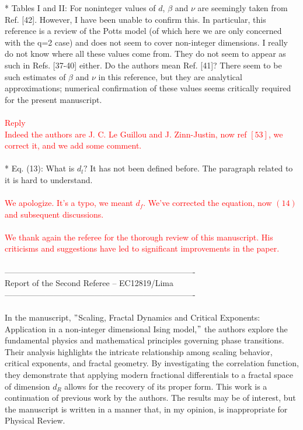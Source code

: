 \documentclass[prd,aps,nofootinbib]{revtex4}
\begin{document}
* Tables I and II: For noninteger values of $d$, $\beta$ and $\nu$ are seemingly taken from Ref. [42]. However, I have been unable to confirm this. In particular, this reference is a review of the Potts model (of which here we are only concerned with the q=2 case) and does not seem to cover non-integer dimensions. I really do not know where all these values come from. They do not seem to appear as such in Refs. [37-40] either. Do the authors mean Ref. [41]? There seem to be such estimates of $\beta$ and $\nu$ in this reference, but they are analytical approximations; numerical confirmation of these values seems critically required for the present manuscript.\\
\\
\textcolor{red}{Reply}\\
\textcolor{red}{ Indeed the authors are J. C. Le Guillou and J. Zinn-Justin, now ref $[53]$, we correct it, and we add some comment.}\\
\\
* Eq. (13): What is $d_l?$ It has not been defined before. The paragraph
related to it is hard to understand.\\
\\
\textcolor{red}{We apologize. It's a typo, we meant $d_f$. We've corrected the equation, now $(14)$ and subsequent discussions. }\\
\\
\textcolor{red}{ We thank again the referee for the thorough review of this manuscript. His criticisms and suggestions have led to significant improvements in the paper.}\\
\\
----------------------------------------------------------------------\\
Report of the Second Referee -- EC12819/Lima\\
----------------------------------------------------------------------\\
\\
In the manuscript, $"$Scaling, Fractal Dynamics and Critical Exponents: Application in a non-integer dimensional Ising model,$"$ the authors explore the fundamental physics and mathematical principles governing phase transitions. Their analysis highlights the intricate relationship among scaling behavior, critical exponents, and fractal geometry. By investigating the correlation function, they demonstrate that applying modern fractional differentials to a fractal space of dimension $d_R$ allows for the recovery of its proper form. This work is a continuation of previous work by the authors. The results may be of interest, but the manuscript is written in a manner that, in my opinion, is inappropriate for Physical Review. \\
\end{document}
